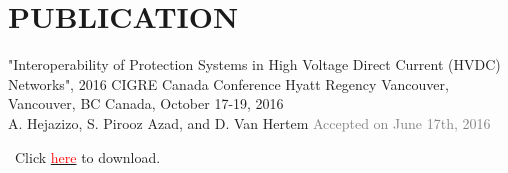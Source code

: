 \documentclass[10pt,a4paper,sans]{moderncv} %
\begin{document}
\section{PUBLICATION}
"Interoperability of Protection Systems in High Voltage Direct Current (HVDC) Networks", 2016 CIGRE Canada Conference 
Hyatt Regency Vancouver, Vancouver, BC Canada, October 17-19, 2016 \\
A. Hejazizo, S. Pirooz Azad, and D. Van Hertem  \hfill \textcolor{gray}{Accepted on June 17th, 2016}

\textcolor{gray}{\faCloudDownload}~Click \href{https://cigre.ca/papers/cigre-paper-hejazizo-ualberta-ca-y-641.pdf}{\textcolor{red}{here}} to download.

%

\end{document}
